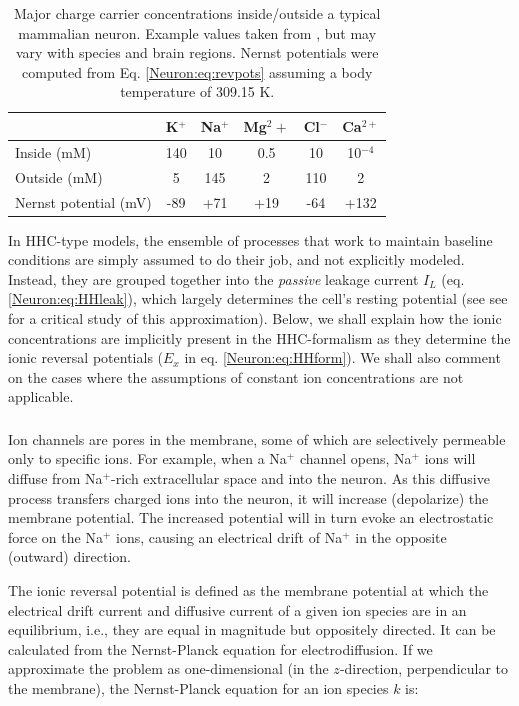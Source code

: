 \begin{table}[h]
\centering
\caption{Major charge carrier concentrations inside/outside a typical mammalian neuron. Example values taken from \cite{Wu2019}, but may vary with species and brain regions. Nernst potentials were computed from Eq. \ref{Neuron:eq:revpots} assuming a body temperature of 309.15 K.}
\label{table:ion-concentrations}
{\begin{tabular}{lccccc}\toprule
						    & 	K$^+$	&	Na$^+$	&	Mg$^2+$	  &	Cl$^-$	&	Ca$^{2+}$	 \\ \midrule
Inside (mM)				    & 140		&		10	&		0.5	&	10		&  	10$^{-4}$	  	\\
Outside (mM)			           & 5			&		145	&		2	&	110 		&		2		  	\\
Nernst potential (mV)		    &	-89		&	    	+71	&		+19	&	-64		&		+132 		  	\\
\bottomrule
\end{tabular}}{}
\end{table}

In HHC-type models, the ensemble of processes that work to maintain baseline conditions are simply assumed to do their job, and not explicitly modeled. Instead, they are grouped together into the \textit{passive} leakage current $I_L$ (eq. \ref{Neuron:eq:HHleak}), which largely determines the cell's resting potential (see see \cite{offner1991} for a critical study of this approximation). Below, we shall explain how the ionic concentrations are implicitly present in the HHC-formalism as they determine the ionic reversal potentials ($E_x$ in eq. \ref{Neuron:eq:HHform}). We shall also comment on the cases where the assumptions of constant ion concentrations are not applicable. 


\subsubsection{}
\label{sec:Neuron:Erev}
Ion channels are pores in the membrane, some of which are selectively permeable only to specific ions. For example, when a Na$^+$ channel opens, Na$^+$ ions will diffuse from Na$^+$-rich extracellular space and into the neuron. As this diffusive process transfers charged ions into the neuron, it will increase (depolarize) the membrane potential. The increased potential will in turn evoke an electrostatic force on the Na$^+$ ions, causing an electrical drift of Na$^+$ in the opposite (outward) direction. 

The ionic reversal potential is defined as the membrane potential at which the electrical drift current and diffusive current of a given ion species are in an equilibrium, i.e., they are equal in magnitude but oppositely directed. It can be calculated from the Nernst-Planck equation for electrodiffusion. If we approximate the problem as one-dimensional (in the $z$-direction, perpendicular to the membrane), the Nernst-Planck equation for an ion species $k$ is:

